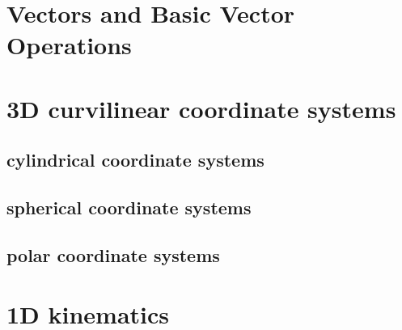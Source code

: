 \documentclass{beamer}
\begin{document}
\section{Vectors and Basic Vector Operations}
\section{3D curvilinear coordinate systems}
\subsection{cylindrical coordinate systems}
\subsection{spherical coordinate systems}
\subsection{polar coordinate systems}
\section{1D kinematics}
\begin{frame}
    
\end{frame}


\end{document}
